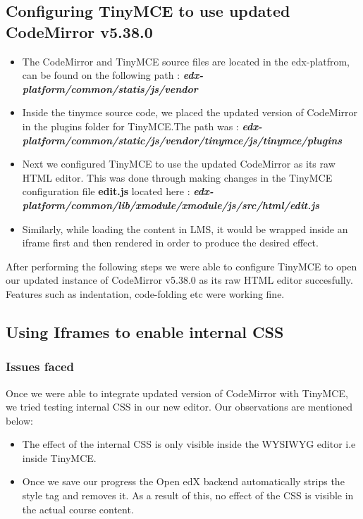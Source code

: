 \subsection{Configuring TinyMCE to use updated CodeMirror v5.38.0}
\begin{itemize}
\item The CodeMirror and TinyMCE source files are located in the edx-platfrom, can be found on
the following path : \textit{\textbf{edx-platform/common/statis/js/vendor}}
\item Inside the tinymce source code, we placed the updated version of CodeMirror in the plugins
folder for TinyMCE.\newline The path was :
\textit{\textbf{edx-platform/common/static/js/vendor/tinymce/js/tinymce/plugins}}
\item Next we configured TinyMCE to use the updated CodeMirror as its raw HTML editor. This
was done through making changes in the TinyMCE configuration file \textbf{edit.js} located here :\newline
\textbf{\textit{edx-platform/common/lib/xmodule/xmodule/js/src/html/edit.js}}
\item Similarly, while loading the content in LMS, it would be wrapped inside an iframe
first and then rendered in order to produce the desired effect.
\end{itemize}
After performing the following steps we were able to configure TinyMCE to open our updated
instance of CodeMirror v5.38.0 as its raw HTML editor succesfully. Features such as indentation,
code-folding etc were working fine.

\subsection{Using Iframes to enable internal CSS}
\subsubsection{Issues faced}
Once we were able to integrate updated version of CodeMirror with TinyMCE, we tried testing
internal CSS in our new editor. Our observations are mentioned below:
\begin{itemize}
\item  The effect of the internal CSS is only visible inside the WYSIWYG editor i.e inside
TinyMCE.
\item  Once we save our progress the Open edX backend automatically strips the style tag and
removes it. As a result of this, no effect of the CSS is visible in the actual course content.
\end{itemize}


